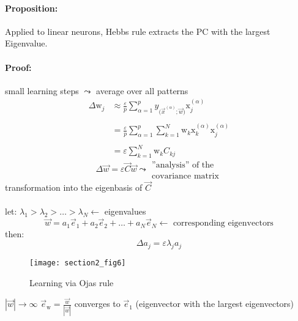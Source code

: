 \paragraph{Proposition:} Applied to linear neurons, Hebbs rule extracts the PC with the largest Eigenvalue.

\paragraph{Proof:}
small learning steps $\leadsto$ average over all patterns
\begin{equation}
	\begin{array}{ll}
		\Delta \mathrm{w}_j 
		& \approx \frac{\varepsilon}{p} \sum\limits_{\alpha = 1}^p 
			y_{\big( \vec{x}^{(\alpha)};
			\vec{w} \big) } \mathrm{x}_j^{(\alpha)} \\\\
		& = \frac{\varepsilon}{p} \sum\limits_{\alpha = 1}^p
			\sum\limits_{k = 1}^N \mathrm{w}_k
			\mathrm{x}_k^{(\alpha)} \mathrm{x}_j^{(\alpha)} \\\\
		& = \varepsilon \sum\limits_{k = 1}^N \mathrm{w}_k C_{kj}
	\end{array}
\end{equation}
\begin{equation}
	\Delta \vec{w} = \varepsilon \vec{C} \vec{w} \leadsto 
		\substack{ 	\text{''analysis'' of the} \\
				\text{covariance matrix} }
\end{equation}
transformation into the eigenbasis of $\vec{C}$
\\\\
let: $\lambda_1 > \lambda_2 > \ldots > \lambda_N \leftarrow$ eigenvalues
\begin{equation}
	\vec{w} = a_1 \vec{e}_1 + a_2 \vec{e}_2 + \ldots + a_N \vec{e}_N 
		\leftarrow \text{ corresponding eigenvectors}
\end{equation}
then:
\begin{equation}
	\Delta a_j = \varepsilon \lambda_j a_j
\end{equation}

\begin{figure}[h]
  \centering
\texttt{[image: section2\_fig6]}  
  \caption{Learning via Ojas rule}
  \label{fig:learningOjasRule}
\end{figure}



\begin{itemize}
	\itr $|\vec{w}| \rightarrow \infty$
	\itr $\vec{e}_{\mathrm{w}} = \frac{\vec{w}}{|\vec{w}|}$ converges to
		$\vec{e}_1$ (eigenvector with the largest eigenvectors)
\end{itemize}

